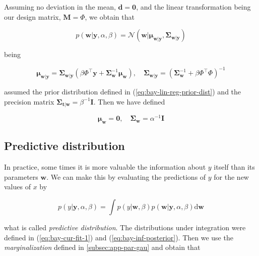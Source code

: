 \documentclass[11pt]{article} %
\begin{document}
 Assuming no deviation in the mean, $\mathbf{d} = \mathbf{0}$, and the linear transformation being our design matrix, $\mathbf{M} = \Phi$, we obtain that

 \begin{equation}
   \label{eq:bay-inf-posterior}
    p(\mathbf{w}|\mathbf{y},\alpha,\beta) = \mathcal{N} \left( \mathbf{w} | \boldsymbol{\mu}_{\mathbf{w}|\mathbf{y}} , \boldsymbol{\Sigma}_{\mathbf{w}|\mathbf{y}}\right)
 \end{equation}

 being

 \begin{equation}
   \boldsymbol{\mu}_{\mathbf{w}|\mathbf{y}}=\boldsymbol{\Sigma}_{\mathbf{w}|\mathbf{y}}\left(\beta \Phi^\top \mathbf{y}+\boldsymbol{\Sigma}_{\mathbf{w}}^{-1} \boldsymbol{\mu}_{\mathbf{w}}\right), \quad \boldsymbol{\Sigma}_{\mathbf{w}|\mathbf{y}}=\left(\boldsymbol{\Sigma}_{\mathbf{w}}^{-1}+ \beta \Phi^\top \Phi\right)^{-1}
 \end{equation}

 assumed the prior distribution defined in (\ref{eq:bay-lin-reg-prior-dist}) and the precision matrix $\boldsymbol{\Sigma}_{\mathbf{t}|\mathbf{w}} = \beta^{-1}\mathbf{I}$. Then we have defined

 \begin{equation}
    \boldsymbol{\mu}_\mathbf{w}=\mathbf{0}, \quad \boldsymbol{\Sigma}_\mathbf{w} = \alpha^{-1} \mathbf{I}
 \end{equation}

\subsection{Predictive distribution}

In practice, some times it is more valuable the information about $y$ itself than its parameters $\mathbf{w}$. We can make this by evaluating the predictions of $y$ for the new values of $x$ by

\begin{equation}
   p(y | \mathbf{y}, \alpha, \beta)=\int p(y | \mathbf{w}, \beta) p(\mathbf{w} | \mathbf{y}, \alpha, \beta) \mathrm{d} \mathbf{w}
\end{equation}

what is called \textit{predictive distribution}. The distributions under integration were defined in (\ref{eq:bay-cur-fit-1}) and (\ref{eq:bay-inf-posterior}). Then we use the \textit{marginalization} defined in \autoref{subsec:app-par-gau} and obtain that
\end{document}
